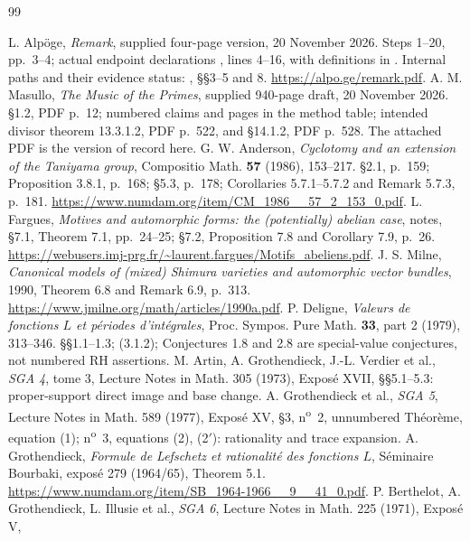 \documentclass[11pt,a4paper]{article}
\theoremstyle{definition}
\begin{document}
\clearpage
\begin{thebibliography}{99}
 L. Alp\"oge, \emph{Remark}, supplied four-page version,
20 November 2026. Steps 1--20, pp.~3--4; actual endpoint declarations
, lines 4--16, with definitions in
. Internal paths and their evidence status:
, \S\S3--5 and 8.
\url{https://alpo.ge/remark.pdf}.
 A. M. Masullo, \emph{The Music of the Primes}, supplied
940-page draft, 20 November 2026. \S1.2, PDF p.~12; numbered claims and
pages in the method table; intended divisor theorem 13.3.1.2, PDF p.~522,
and \S14.1.2, PDF p.~528. The attached PDF is the version of record here.
 G. W. Anderson, \emph{Cyclotomy and an extension of
the Taniyama group}, Compositio Math. \textbf{57} (1986), 153--217.
\S2.1, p.~159; Proposition 3.8.1, p.~168; \S5.3, p.~178;
Corollaries 5.7.1--5.7.2 and Remark 5.7.3, p.~181.
\url{https://www.numdam.org/item/CM_1986__57_2_153_0.pdf}.
 L. Fargues, \emph{Motives and automorphic forms:
the (potentially) abelian case}, notes, \S7.1, Theorem 7.1, pp.~24--25;
\S7.2, Proposition 7.8 and Corollary 7.9, p.~26.
\url{https://webusers.imj-prg.fr/~laurent.fargues/Motifs_abeliens.pdf}.
 J. S. Milne, \emph{Canonical models of (mixed)
Shimura varieties and automorphic vector bundles}, 1990,
Theorem 6.8 and Remark 6.9, p.~313.
\url{https://www.jmilne.org/math/articles/1990a.pdf}.
 P. Deligne, \emph{Valeurs de fonctions $L$ et
p\'eriodes d'int\'egrales}, Proc. Sympos. Pure Math. \textbf{33}, part 2
(1979), 313--346. \S\S1.1--1.3; (3.1.2); Conjectures 1.8 and 2.8
are special-value conjectures, not numbered RH assertions.
 M. Artin, A. Grothendieck, J.-L. Verdier et al.,
\emph{SGA 4}, tome 3, Lecture Notes in Math. 305 (1973),
Expos\'e XVII, \S\S5.1--5.3: proper-support direct image and base change.
 A. Grothendieck et al., \emph{SGA 5}, Lecture Notes in
Math. 589 (1977), Expos\'e XV, \S3, n\textsuperscript{o}~2,
unnumbered Th\'eor\`eme, equation (1); n\textsuperscript{o}~3,
equations (2), (2$'$): rationality and trace expansion.
 A. Grothendieck, \emph{Formule de Lefschetz et
rationalit\'e des fonctions $L$}, S\'eminaire Bourbaki, expos\'e 279
(1964/65), Theorem 5.1.
\url{https://www.numdam.org/item/SB_1964-1966__9__41_0.pdf}.
 P. Berthelot, A. Grothendieck, L. Illusie et al.,
\emph{SGA 6}, Lecture Notes in Math. 225 (1971), Expos\'e V,

\end{thebibliography}
\end{document}
